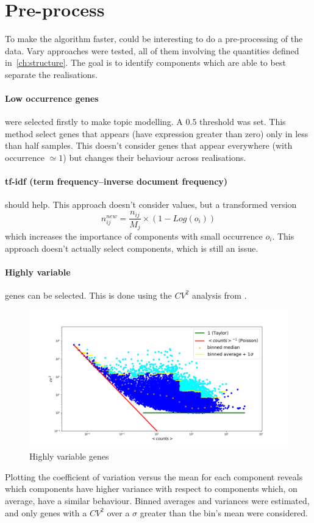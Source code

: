 \section{Pre-process}
To make the algorithm faster, could be interesting to do a pre-processing of the data.
Vary approaches were tested, all of them involving the quantities defined in~\ref{ch:structure}. The goal is to identify components which are able to best separate the realisations. 
\paragraph{Low occurrence genes} were selected firstly to make topic modelling. A  $0.5$ threshold was set. This method select genes that appears (have expression greater than zero) only in less than half samples. This doesn't consider genes that appear everywhere (with occurrence $\simeq 1$) but changes their behaviour across realisations.

\paragraph{tf-idf (term frequency–inverse document frequency)} should help. This approach doesn't consider values, but a transformed version
\[
n^{new}_{ij}=\frac{n_{i j}}{M_j}\times \left(1-Log\left(o_i\right)\right)
\] which increases the importance of components with small occurrence $o_i$. This approach doesn't actually select components, which is still an issue.

\paragraph{Highly variable} genes can be selected. This is done using the $CV^2$ analysis from .
\begin{figure}[htb!]
    \centering
    \includegraphics[width=0.8\linewidth]{pictures/topic/cvmean_oversigma.png}
    \caption{Highly variable genes}
    \label{fig:topic/cvmean_oversigma}
\end{figure}
Plotting the coefficient of variation versus the mean for each component reveals which components have higher variance with respect to components which, on average, have a similar behaviour.
Binned averages and variances were estimated, and only genes with a $CV^2$ over a $\sigma$ greater than the bin's mean were considered.

